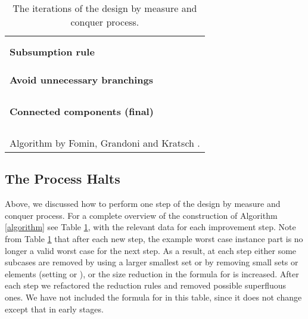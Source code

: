 \documentclass[fleqn]{stacs_proc}
\begin{document}
\begin{table}
\begin{center}
\begin{tabular}{|ll|}
&  \\
 &  \\
\hline
\textbf{Subsumption rule}						&  \\
\multicolumn{2}{|l|}{  } \\

&  \\
 &  \\
\hline
\textbf{Avoid unnecessary branchings}	&  \\
\multicolumn{2}{|l|}{  } \\

&  \\
\multicolumn{2}{|l|}{  } \\
\multicolumn{2}{|l|}{  } \\
\hline
\textbf{Connected components (final)}	&  \\
\multicolumn{2}{|l|}{  } \\

&  \\
\multicolumn{2}{|l|}{  } \\
\multicolumn{2}{|l|}{  } \\
\hline
\multicolumn{2}{l}{  Algorithm by Fomin, Grandoni and Kratsch \cite{FominGK05a}.}
\end{tabular} \end{center}
\caption{The iterations of the design by measure and conquer process.}
\label{tab:steps}
\end{table}


\subsection{The Process Halts}
Above, we discussed 
how to perform one step of the design by measure and conquer process.
For a complete overview of the construction of Algorithm \ref{algorithm} see
Table \ref{tab:steps}, with the relevant data for each improvement step.
Note from Table \ref{tab:steps}
that after each new step, the example worst case instance part
is no longer a valid worst case for the next step.
As a result, at each step either some subcases are removed by using
a larger smallest set  or by removing small sets or elements (setting  or ),
or the size reduction in the formula for  is increased.
After each step we refactored the reduction rules and removed possible superfluous ones.
We have not included the formula for  in this table,
since it does not change except that  in early stages.
\end{document}

